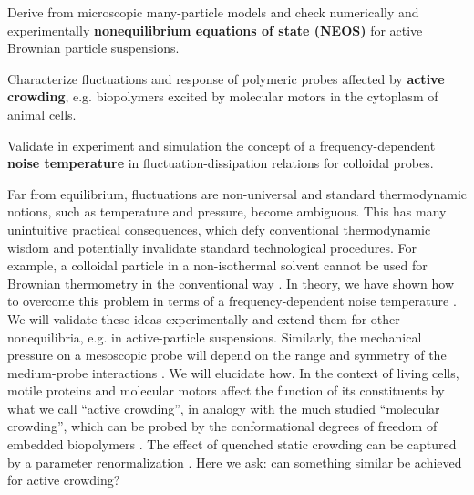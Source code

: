 \begin{workpackage}[id=WPactive,wphases=0-48,
  short=Active Particle Suspensions,%
  title=Probing active particle suspensions with colloids and polymers,
  lead=ULEI,
  ULEIRM=96,UNIPDRM=6,USTUTTRM=2]

\newrefsection

\begin{mdframed}
\mobjectives
%
  \begin{compactitem}
  \item Derive from microscopic many-particle models and check numerically and experimentally 
  \textbf{nonequilibrium equations of state (NEOS)} for active Brownian particle suspensions.
  \item Characterize fluctuations and response of polymeric probes affected by \textbf{active
    crowding}, e.g. biopolymers excited by molecular motors in the cytoplasm of animal cells.
  \item Validate in experiment and simulation the concept of a frequency-dependent \textbf{noise temperature} 
  in fluctuation-dissipation relations for colloidal probes.
  \end{compactitem}

\mdescription
%
Far from equilibrium, fluctuations are non-universal and standard thermodynamic notions,
such as temperature and pressure, become ambiguous. 
This has many unintuitive practical consequences, which defy conventional thermodynamic
wisdom and potentially invalidate standard technological procedures.
%
For example, a colloidal particle in a non-isothermal solvent cannot be used for Brownian thermometry 
in the conventional way \cite{rings-etal:2010,kroy:2014}. In theory, we have shown how to overcome this problem
in terms of a frequency-dependent noise temperature \cite{falasco-etal:2014}.
%
We will validate these ideas experimentally and extend them for other
nonequilibria, e.g. in active-particle suspensions.
%
Similarly, the mechanical pressure on a mesoscopic probe will depend on the range and symmetry 
of the medium-probe interactions \cite{solon-etal:2015}. We will elucidate how. 
%
In the context of living cells, motile proteins and molecular motors affect the function
of its constituents by what  we call ``active crowding'', in analogy with the much studied ``molecular crowding'',
which can be probed by the conformational degrees of freedom of embedded biopolymers  \cite{otto-etal:2013}.
%
The effect of quenched static crowding can be captured by a parameter renormalization \cite{schoebl-etal:2014}.  
%
Here we ask: can something similar be achieved for active crowding?
\end{mdframed}


\end{workpackage}
